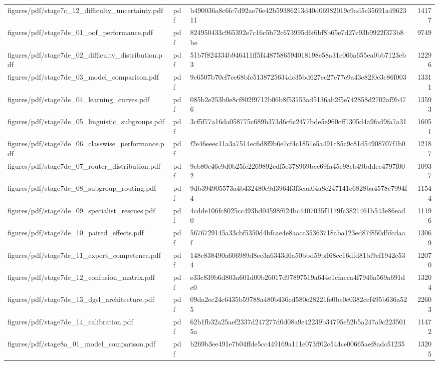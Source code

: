 \begin{tabular}{lllr}
figures/pdf/stage7c_12_difficulty_uncertainty.pdf & pdf & b490036a8c6fc7d92ae76e42b59386213d40d06982019c9ad5e35691a4962311 & 14177 \\
figures/pdf/stage7de_01_oof_performance.pdf & pdf & 824950433c965392e7c16c5b72c673995d6f6bf8b65e7d27e93b9922f373b8be & 9749 \\
figures/pdf/stage7de_02_difficulty_distribution.pdf & pdf & 51b7f824334b946411ff5f4487586594018198e58a31c066a655ea0bb7123eb3 & 12296 \\
figures/pdf/stage7de_03_model_comparison.pdf & pdf & 9e6507b70cf7ce68bfe5138725634dc35bd627ec27e77e9a43e82f0e3e86f003 & 13311 \\
figures/pdf/stage7de_04_learning_curves.pdf & pdf & 085b2e253b0e8cf802f9712b06b8f53153ad5136ab2f5e742858d2702af9b476 & 13593 \\
figures/pdf/stage7de_05_linguistic_subgroups.pdf & pdf & 3cf5f77a16da058775c689b373d6c6c2477bde5e960cff1305d4a9fad9fa7a31 & 16051 \\
figures/pdf/stage7de_06_classwise_performance.pdf & pdf & f2e46eeec11a3a7514ec6d8f9b6e7cf4c1851e5a491c85c9c81d54908707f1b0 & 12187 \\
figures/pdf/stage7de_07_router_distribution.pdf & pdf & 9cb80c46e9d0b25fe2269892cdf5e378969bce69fa45e98cb49bddec4797f002 & 10937 \\
figures/pdf/stage7de_08_subgroup_routing.pdf & pdf & 9db394905573a4b432480e9d3964f3f3caa04a8e247141e6828ba4578e7994f4 & 11544 \\
figures/pdf/stage7de_09_specialist_rescues.pdf & pdf & 4cdde106fc8025cc493bd04598f624bc4407035f1179fc3821461b543e86ead0 & 11196 \\
figures/pdf/stage7de_10_paired_effects.pdf & pdf & 5676729145a33cbf5350d4bfcae4e8aacc35363718aba123ed87f850d5fcdaaf & 13069 \\
figures/pdf/stage7de_11_expert_competence.pdf & pdf & 148c838490a606989d8ec3a6343d6a50bbd59bff68cc16dfd81bf9ef1942c534 & 12070 \\
figures/pdf/stage7de_12_confusion_matrix.pdf & pdf & e33c839b6d803a601d00b26017d97897519a644e1cfacca4f7946a569a691dc0 & 13204 \\
figures/pdf/stage7de_13_dgsl_architecture.pdf & pdf & 09da2ec24c6435b59788a480b436cd580e28221fe0be0c0382cef495b636a525 & 22603 \\
figures/pdf/stage7de_14_calibration.pdf & pdf & 62b1fb32a25aef2337d247277d0d08a9e42239b34795e52b5a247a9c2235015a & 11472 \\
figures/pdf/stage8a_01_model_comparison.pdf & pdf & b269b3ee491e7b04ffde5cc449169a111e073ff02c544ce00665aef8adc51235 & 13205 \\

\end{tabular}
